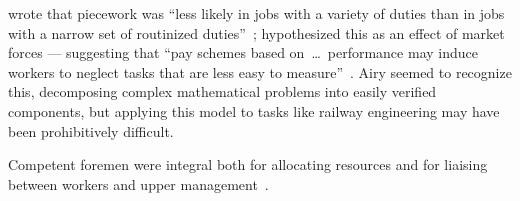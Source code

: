 \documentclass[trackingWork]{subfiles}
\begin{document}
{
\citeauthor{Brown01041990} wrote that piecework was
``less likely in jobs with a variety of duties than in
jobs with a narrow set of routinized duties''~\cite{Brown01041990};
\citeauthor{SJOE:SJOE371} hypothesized this as an effect of market forces
--- suggesting that
``pay schemes based on~\dots~performance may induce workers to neglect tasks that are less easy to measure''~\cite{SJOE:SJOE371}.
Airy seemed to recognize this,
decomposing complex mathematical problems into easily verified components, %
but applying this model to tasks like railway engineering may have been prohibitively difficult.

Competent foremen were integral both for allocating resources and
for liaising between workers and upper management~\cite{wray1949marginal,10.2307/2118435}.





}
\end{document}
